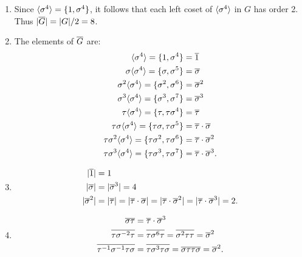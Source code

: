 \begin{enumerate}
      \begin{enumerate}
         \item Since $\langle \sigma^4 \rangle = \{1, \sigma^4\}$, it follows that each 
               left coset of $\langle \sigma^4 \rangle$ in $G$ has order 2. Thus
               $|\overline{G}| = |G|/2 = 8$.
         \item The elements of $\overline{G}$ are:
               \begin{align*}
                  \langle \sigma^4 \rangle = \{1, \sigma^4\} &= \overline{1} \\
                  \sigma\langle \sigma^4 \rangle = \{\sigma, \sigma^5\} &= \overline{\sigma} \\
                  \sigma^2\langle \sigma^4 \rangle=\{\sigma^2,\sigma^6\} &=\overline{\sigma}^2 \\
                  \sigma^3\langle \sigma^4 \rangle =\{\sigma^3,\sigma^7\}&=\overline{\sigma}^3 \\
                  \tau\langle \sigma^4 \rangle = \{\tau, \tau\sigma^4\} &= \overline{\tau} \\
                  \tau\sigma\langle \sigma^4 \rangle = \{\tau\sigma, \tau\sigma^5\} &=
                     \overline{\tau}\cdot\overline{\sigma} \\
                  \tau\sigma^2\langle \sigma^4 \rangle = \{\tau\sigma^2, \tau\sigma^6\} &= 
                     \overline{\tau}\cdot\overline{\sigma}^2 \\
                  \tau\sigma^3\langle \sigma^4 \rangle = \{\tau\sigma^3, \tau\sigma^7\} &= 
                     \overline{\tau}\cdot\overline{\sigma}^3.
               \end{align*}
         \item \begin{align*}
                  |\overline{1}| &= 1 \\
                  |\overline{\sigma}| &= |\overline{\sigma}^3| = 4 \\
                  |\overline{\sigma}^2|&= |\overline{\tau}| = |\overline{\tau}\cdot\overline{\sigma}| =
                  |\overline{\tau}\cdot\overline{\sigma}^2| = |\overline{\tau}\cdot\overline{\sigma}^3| = 2.
               \end{align*}
         \item \begin{align*}
                  \m{\sigma\tau} &= \m{\tau}\cdot\m{\sigma}^3 \\
                  \m{\tau\sigma^{-2}\tau} &= \m{\tau\sigma^6\tau} =
                     \m{\sigma^2\tau\tau} = \m{\sigma}^2\\
                  \m{\tau^{-1}\sigma^{-1}\tau\sigma} &=
                     \m{\tau\sigma^3\tau\sigma} =
                     \m{\sigma\tau\tau\sigma} = \m{\sigma}^2.

\end{align*}
\end{enumerate}
\end{enumerate}
